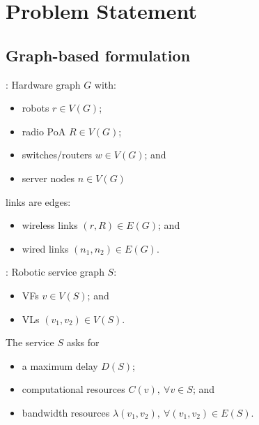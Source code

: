 \documentclass[aspectratio=169,dvipsnames]{beamer}
\begin{document}
\section{Problem Statement}


\subsection{Graph-based formulation}
\begin{frame}{\secname: \subsecname}
    Hardware graph $G$ with:
    \begin{itemize}
        \item robots $r\in V(G)$;
        \item radio PoA $R\in V(G)$;
        \item switches/routers $w \in V(G)$; and
        \item server nodes $n \in V(G)$
    \end{itemize}
    links are edges:
    \begin{itemize}
        \item wireless links $(r,R)\in E(G)$; and
        \item wired links $(n_1,n_2)\in E(G)$.
    \end{itemize}
\end{frame}


\begin{frame}{\secname: \subsecname}
    Robotic service graph $S$:
    \begin{itemize}
        \item VFs $v\in V(S)$; and
        \item VLs $(v_1,v_2)\in V(S)$.
    \end{itemize}
    The service $S$ asks for
    \begin{itemize}
        \item a maximum delay $D(S)$;
        \item computational resources $C(v),\ \forall v\in S$; and
        \item bandwidth resources $\lambda(v_1,v_2),\ \forall (v_1,v_2)\in E(S)$.
    \end{itemize}
\end{frame}
\end{document}
